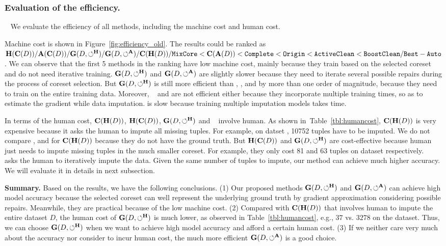  



\subsubsection{Evaluation of the efficiency.}~\label{sec:exp:efficiency} We  evaluate the efficiency of all methods, including the machine cost and human cost.

 Machine cost is shown  in Figure~\ref{fig:efficiency_old}.  The results could be ranked as $\mathbf{H}(\mathbf{C}(D))/\mathbf{A}(\mathbf{C}(D))/\mathbf{G}(D,\circlearrowleft^\mathbf{H})/\mathbf{G}(D,\circlearrowleft^\mathbf{A})/\mathbf{C}(\mathbf{H}(D))/{\tt MixCore} < \mathbf{C}(\mathbf{A}(D)) < {\tt Complete} < {\tt Origin} < {\tt ActiveClean} < {\tt BoostClean} /{\tt Best-Auto} $. We can observe that the first 5 methods in the ranking have low machine cost, mainly because they train based on the selected coreset and do not need iterative training. $\mathbf{G}(D,\circlearrowleft^\mathbf{H})$ and  $\mathbf{G}(D,\circlearrowleft^\mathbf{A})$ are slightly slower  because they need to iterate several possible repairs during the process of coreset selection.  But $\mathbf{G}(D,\circlearrowleft^\mathbf{H})$ is still more efficient than \noclean, \truth, \boostclean and \gain by more than one order of magnitude,  because they need to train on the entire training data. 
 Moreover, \actclean~  and \boostclean are  not efficient either because they incorporate multiple training times, so as to estimate the gradient while data imputation. \gain is slow because training multiple imputation models takes time.


 In terms of the human cost, $\mathbf{C}(\mathbf{H}(D))$, $\mathbf{H}(\mathbf{C}(D))$, $\mathbf{G}(D,\circlearrowleft^\mathbf{H})$ and  \actclean~ involve human. As shown in~Table~\ref{tbl:humancost}, $\mathbf{C}(\mathbf{H}(D))$ is very expensive because it asks the human to impute all missing tuples. For example, on datset \adult, 10752 tuples have to be imputed. We do not compare \credit, \bike and \air for $\mathbf{C}(\mathbf{H}(D))$ because they do not have the ground truth.
 But $\mathbf{H}(\mathbf{C}(D))$ and $\mathbf{G}(D,\circlearrowleft^\mathbf{H})$ are cost-effective because human just needs to impute missing tuples in the much smaller coreset. For example, they only cost 81 and 63 tuples on dataset \adult respectively. 
\actclean~ asks the human to iteratively impute the data. Given the same number of tuples to impute, our method can achieve much higher accuracy. We will  evaluate it in details in next subsection.
 



\noindent \textbf{Summary.} 
Based on the results, we have the following conclusions.
(1) Our proposed methods $\mathbf{G}(D,\circlearrowleft^\mathbf{H})$ and $\mathbf{G}(D,\circlearrowleft^\mathbf{A})$ can achieve high model accuracy because the selected coreset can well represent the underlying ground truth by gradient approximation considering possible repairs. Meanwhile, they are practical because of the low machine cost. (2) Compared with $\mathbf{C}(\mathbf{H}(D))$ that involves human to impute the entire dataset $D$, the human cost of $\mathbf{G}(D,\circlearrowleft^\mathbf{H})$ is much lower, as observed in Table~\ref{tbl:humancost}, e.g., $37$ vs. $3278$ on the \nursery dataset. Thus, we can choose $\mathbf{G}(D,\circlearrowleft^\mathbf{H})$ when we want to achieve high model accuracy and afford a certain human cost. (3) 
If we neither care very much about the accuracy nor consider to incur human cost, the much more efficient $\mathbf{G}(D,\circlearrowleft^\mathbf{A})$ is a good choice.